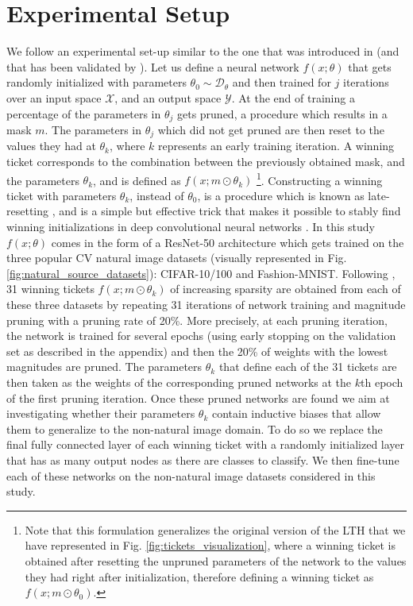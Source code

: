 \section{Experimental Setup}
\label{sec:experimental_setup}
We follow an experimental set-up similar to the one that was introduced in \cite{morcos2019one} (and that has been validated by \cite{gohil2019one}).
Let us define a neural network $f(x;\theta)$ that gets randomly initialized with parameters $\theta_0 \sim \mathcal{D}_{\theta}$ and then trained for $j$ iterations
over an input space $\mathcal{X}$, and an output space $\mathcal{Y}$. 
At the end of training a percentage of the parameters in $\theta_j$ gets pruned, a procedure which results in a mask $m$. The parameters in $\theta_j$ which did not get pruned are then reset to the values they had at $\theta_k$, where $k$ represents an early training iteration. A winning ticket corresponds to the combination between the previously obtained mask, and the parameters $\theta_k$, and is defined as $f(x;m\odot\theta_k)$ \footnote{Note that this formulation generalizes the original version of the LTH \cite{frankle2018lottery} that we have represented in Fig. \ref{fig:tickets_visualization}, where a winning ticket is obtained after resetting the unpruned parameters of the network to the values they had right after initialization, therefore defining a winning ticket as $f(x;m\odot\theta_0)$.}. Constructing a winning ticket with parameters $\theta_k$, instead of $\theta_0$, is a procedure which is known as late-resetting \cite{franklestabilizing}, and is a simple but effective trick that makes it possible to stably find winning initializations in deep convolutional neural networks \cite{franklestabilizing,morcos2019one}. In this study $f(x;\theta)$ comes in the form of a ResNet-50 architecture \cite{han2015deep} which gets trained on the three popular CV natural image datasets (visually represented in Fig. \ref{fig:natural_source_datasets}): CIFAR-10/100 and Fashion-MNIST. Following \cite{han2015deep,morcos2019one}, 31 winning tickets $f(x;m\odot\theta_k)$ of increasing sparsity are obtained from each of these three datasets by repeating 31 iterations of network training and magnitude pruning with a pruning rate of 20\%.
More precisely, at each pruning iteration, the network is trained for several epochs (using early stopping on the validation set as described in the appendix) and then the 20\% of weights with the lowest magnitudes are pruned. The parameters $\theta_k$ that define each of the 31 tickets are then taken as the weights of the corresponding pruned networks at the $k$th epoch of the first pruning iteration. Once these pruned networks are found we aim at investigating whether their parameters $\theta_k$ contain inductive biases that allow them to generalize to the non-natural image domain. To do so we replace the final fully connected layer of each winning ticket with a randomly initialized layer that has as many output nodes as there are classes to classify. We then fine-tune each of these networks on the non-natural image datasets considered in this study.
